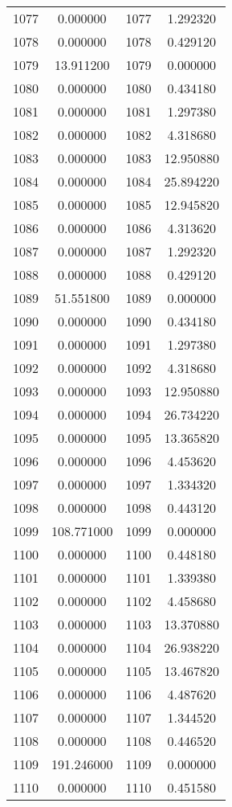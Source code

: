 \documentclass[12pt]{article}
\begin{document}
\begin{longtable}{@{}cccc@{}}
1077 & 0.000000 & 1077 & 1.292320 \\
1078 & 0.000000 & 1078 & 0.429120 \\
1079 & 13.911200 & 1079 & 0.000000 \\
1080 & 0.000000 & 1080 & 0.434180 \\
1081 & 0.000000 & 1081 & 1.297380 \\
1082 & 0.000000 & 1082 & 4.318680 \\
1083 & 0.000000 & 1083 & 12.950880 \\
1084 & 0.000000 & 1084 & 25.894220 \\
1085 & 0.000000 & 1085 & 12.945820 \\
1086 & 0.000000 & 1086 & 4.313620 \\
1087 & 0.000000 & 1087 & 1.292320 \\
1088 & 0.000000 & 1088 & 0.429120 \\
1089 & 51.551800 & 1089 & 0.000000 \\
1090 & 0.000000 & 1090 & 0.434180 \\
1091 & 0.000000 & 1091 & 1.297380 \\
1092 & 0.000000 & 1092 & 4.318680 \\
1093 & 0.000000 & 1093 & 12.950880 \\
1094 & 0.000000 & 1094 & 26.734220 \\
1095 & 0.000000 & 1095 & 13.365820 \\
1096 & 0.000000 & 1096 & 4.453620 \\
1097 & 0.000000 & 1097 & 1.334320 \\
1098 & 0.000000 & 1098 & 0.443120 \\
1099 & 108.771000 & 1099 & 0.000000 \\
1100 & 0.000000 & 1100 & 0.448180 \\
1101 & 0.000000 & 1101 & 1.339380 \\
1102 & 0.000000 & 1102 & 4.458680 \\
1103 & 0.000000 & 1103 & 13.370880 \\
1104 & 0.000000 & 1104 & 26.938220 \\
1105 & 0.000000 & 1105 & 13.467820 \\
1106 & 0.000000 & 1106 & 4.487620 \\
1107 & 0.000000 & 1107 & 1.344520 \\
1108 & 0.000000 & 1108 & 0.446520 \\
1109 & 191.246000 & 1109 & 0.000000 \\
1110 & 0.000000 & 1110 & 0.451580 \\

\end{longtable}
\end{document}
